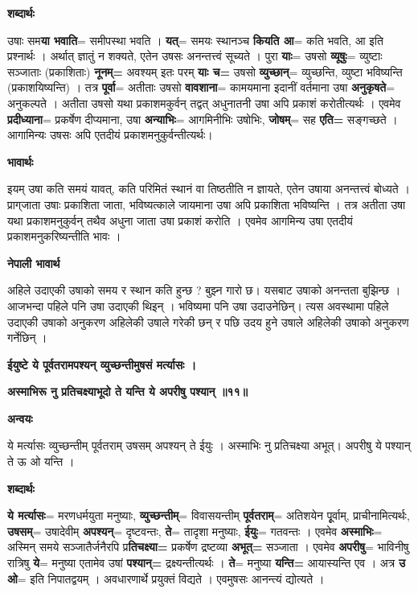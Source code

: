 \documentclass[11pt, a5paper]{article}
\begin{document}
\textbf{शब्दार्थः}

उषाः सम\textbf{या भवाति}= समीपस्था भवति । \textbf{यत्}= समयः स्थानञ्च \textbf{कियति आ}= कति भवति, आ इति प्रश्नार्थः । अर्थात् ज्ञातुं न शक्यते, एतेन उषसः अनन्तत्त्वं सूच्यते । पुरा \textbf{याः}= उषसो \textbf{व्यूषुः}= व्युष्टाः सञ्जाताः (प्रकाशिताः) \textbf{नूनम्=} अवश्यम् इतः परम् \textbf{याः च=} उषसो \textbf{व्युच्छान्}= व्युच्छन्ति, व्युष्टा भविष्यन्ति (प्रकाशयिष्यन्ति) । तत्र \textbf{पूर्वा}= अतीताः उषसो \textbf{वावशाना}= कामयमाना इदानीं वर्तमाना उषा \textbf{अनुकृषते}= अनुकल्पते । अतीता उषसो यथा प्रकाशमकुर्वन् तद्वत् अधुनातनी उषा अपि प्रकाशं करोतीत्यर्थः । एवमेव \textbf{प्रदीध्याना}= प्रकर्षेण दीप्यमाना, उषा \textbf{अन्याभिः}= आगमिनीभिः उषोभिः, \textbf{जोषम्}= सह \textbf{एति=} सङ्‌गच्छते । आगामिन्यः उषसः अपि एतदीयं प्रकाशमनुकुर्वन्तीत्यर्थः।

\textbf{भावार्थः}

इयम् उषा कति समयं यावत्, कति परिमितं स्थानं वा तिष्ठतीति न ज्ञायते, एतेन उषाया अनन्तत्त्वं बोध्यते । प्राग्‌जाता उषाः प्रकाशिता जाता, भविष्यत्काले जायमाना उषा अपि प्रकाशिता भविष्यन्ति । तत्र अतीता उषा यथा प्रकाशमनुकुर्वन् तथैव अधुना जाता उषा प्रकाशं करोति । एवमेव आगमिन्य उषा एतदीयं प्रकाशमनुकरिष्यन्तीति भावः ।

\textbf{नेपाली भावार्थ}

अहिले उदाएकी उषाको समय र स्थान कति हुन्छ ? बुझ्न गारो छ। यसबाट उषाको अनन्तता बुझिन्छ । आजभन्दा पहिले पनि उषा उदाएकी थिइन् । भविष्यमा पनि उषा उदाउनेछिन्। त्यस अवस्थामा पहिले उदाएकी उषाको अनुकरण अहिलेकी उषाले गरेकी छन् र पछि उदय हुने उषाले अहिलेकी उषाको अनुकरण गर्नेछिन् ।

\textbf{ईयुष्टे ये पूर्वतरामपश्यन् व्युच्छन्तीमुषसं मर्त्यासः ।}

\textbf{अस्माभिरू नु प्रतिचक्ष्याभूदो ते यन्ति ये अपरीषु पश्यान् ॥११॥}

\textbf{अन्वयः}

ये मर्त्यासः व्युच्छन्तीम् पूर्वतराम् उषसम् अपश्यन् ते ईयुः । अस्माभिः नु प्रतिचक्ष्या अभूत्। अपरीषु ये पश्यान् ते ऊ ओ यन्ति ।

\textbf{शब्दार्थः}

\textbf{ये मर्त्यासः}= मरणधर्मयुता मनुष्याः, \textbf{व्युच्छन्तीम्}= विवासयन्तीम् \textbf{पूर्वतराम्}= अतिशयेन पूृर्वाम्, प्राचीनामित्यर्थः, \textbf{उषसम्}= उषादेवीम् \textbf{अपश्यन्}= दृष्टवन्तः, \textbf{ते}= तादृशा मनुष्याः, \textbf{ईयुः}= गतवन्तः । एवमेव \textbf{अस्माभिः}= अस्मिन् समये सञ्जातैर्जनैरपि प्र\textbf{तिचक्ष्या=} प्रकर्षेण द्रष्टव्या \textbf{अभूत्=} सञ्जाता । एवमेव \textbf{अपरीषु}= भाविनीषु रात्रिषु  \textbf{ये}= मनुष्या एतामेव उषां \textbf{पश्यान्=} द्रक्ष्यन्तीत्यर्थः । \textbf{ते}= मनुष्या \textbf{यन्ति=} आयास्यन्ति एव । अत्र \textbf{उ ओ}= इति निपातद्वयम् । अवधारणार्थे प्रयुक्तं विद्यते । एवमुषसः आनन्त्यं द्योत्यते ।
\end{document}
